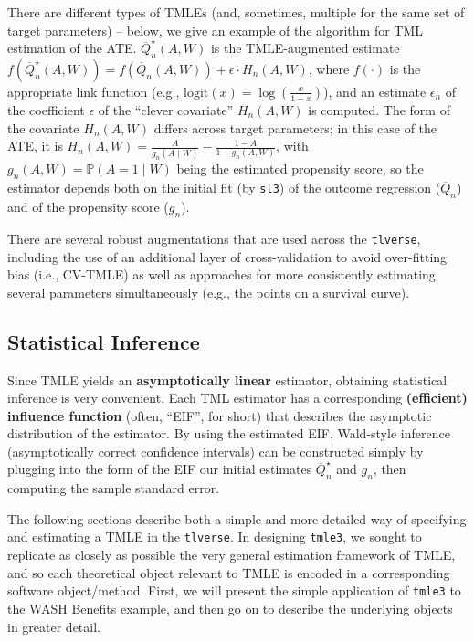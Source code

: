 \documentclass[
  12pt, krantz2,
]{book}
\newcommand{\passthrough}[1]{#1}
\theoremstyle{definition}
\theoremstyle{definition}
\theoremstyle{definition}
\newcommand{\1}{\mathbbm{1}}
\begin{document}
There are different types of TMLEs (and, sometimes, multiple for the same set of
target parameters) -- below, we give an example of the algorithm for TML
estimation of the ATE. \(\overline{Q}^{\star}_n(A,W)\) is the TMLE-augmented
estimate \(f(\overline{Q}^{\star}_n(A,W)) = f(\overline{Q}_n(A,W)) + \epsilon \cdot H_n(A,W)\), where \(f(\cdot)\) is the appropriate link function (e.g.,
\(\text{logit}(x) = \log\left(\frac{x}{1 - x}\right)\)), and an estimate
\(\epsilon_n\) of the coefficient \(\epsilon\) of the ``clever covariate'' \(H_n(A,W)\)
is computed. The form of the covariate \(H_n(A,W)\) differs across target
parameters; in this case of the ATE, it is \(H_n(A,W) = \frac{A}{g_n(A \mid W)} - \frac{1-A}{1-g_n(A, W)}\), with \(g_n(A,W) = \mathbb{P}(A=1 \mid W)\) being the
estimated propensity score, so the estimator depends both on the initial fit (by
\passthrough{\lstinline!sl3!}) of the outcome regression (\(\overline{Q}_n\)) and of the propensity score
(\(g_n\)).

There are several robust augmentations that are used across the \passthrough{\lstinline!tlverse!},
including the use of an additional layer of cross-validation to avoid
over-fitting bias (i.e., CV-TMLE) as well as approaches for more consistently
estimating several parameters simultaneously (e.g., the points on a survival
curve).

\hypertarget{tmle-infer}{%
\subsection{Statistical Inference}\label{tmle-infer}}

Since TMLE yields an \textbf{asymptotically linear} estimator, obtaining statistical
inference is very convenient. Each TML estimator has a corresponding
\textbf{(efficient) influence function} (often, ``EIF'', for short) that describes the
asymptotic distribution of the estimator. By using the estimated EIF, Wald-style
inference (asymptotically correct confidence intervals) can be constructed
simply by plugging into the form of the EIF our initial estimates
\(\overline{Q}^{\star}_n\) and \(g_n\), then computing the sample standard error.

The following sections describe both a simple and more detailed way of
specifying and estimating a TMLE in the \passthrough{\lstinline!tlverse!}. In designing \passthrough{\lstinline!tmle3!}, we
sought to replicate as closely as possible the very general estimation framework
of TMLE, and so each theoretical object relevant to TMLE is encoded in a
corresponding software object/method. First, we will present the simple
application of \passthrough{\lstinline!tmle3!} to the WASH Benefits example, and then go on to describe
the underlying objects in greater detail.
\end{document}
